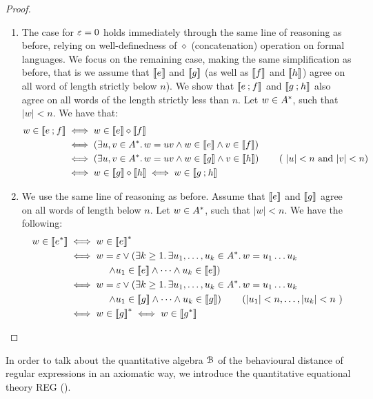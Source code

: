 \begin{proof}
\begin{enumerate}
    \item The case for $\varepsilon = 0$ holds immediately through the same line of reasoning as before, relying on well-definedness of $\diamond$ (concatenation) operation on formal languages. We focus on the remaining case, making the same simplification as before, that is we assume that $\left\llbracket{e}\right\rrbracket$ and $\left\llbracket{g}\right\rrbracket$ (as well as $\left\llbracket{f}\right\rrbracket$ and $\left\llbracket{h}\right\rrbracket$) agree on all word of length strictly below $n$). We show that $\left\llbracket{e \mathbin{;}f}\right\rrbracket$ and $\left\llbracket{g \mathbin{;}h}\right\rrbracket$ also agree on all words of the length strictly less than $n$. Let $w \in {A}^{\ast}$, such that $|w|<n$. We have that: 
    \begin{align*}
        w \in \left\llbracket{e \mathbin{;}f}\right\rrbracket &\iff w \in \left\llbracket{e}\right\rrbracket \diamond \left\llbracket{f}\right\rrbracket\\ &\iff
        \left(\exists u,v \in {A}^\ast \ldotp w=uv \wedge w \in \left\llbracket{e}\right\rrbracket \wedge v \in \left\llbracket{f}\right\rrbracket\right)\\
        &\iff  \left(\exists u,v \in {A}^\ast \ldotp w=uv \wedge w \in \left\llbracket{g}\right\rrbracket \wedge v \in \left\llbracket{h}\right\rrbracket\right) \tag{ $|u|< n$ and $|v| < n$} \\
        &\iff w \in \left\llbracket{g}\right\rrbracket \diamond \left\llbracket{h}\right\rrbracket \iff w \in \left\llbracket{g \mathbin{;}h}\right\rrbracket
    \end{align*}
    \item We use the same line of reasoning as before. Assume that $\left\llbracket{e}\right\rrbracket$ and $\left\llbracket{g}\right\rrbracket$ agree on all words of length below $n$. Let $w \in {A}^\ast$, such that $|w| < n$. We have the following:
    \begin{align*}
        w \in \left\llbracket{e^\ast}\right\rrbracket &\iff w \in \left\llbracket{e}\right\rrbracket^\ast\\ 
        &\iff w = \varepsilon \vee \left(\exists k \geq 1 \ldotp \exists u_1, \dots, u_k \in {A}^\ast \ldotp w = u_1\dots u_k \right.\\&\left. \qquad\qquad\wedge u_1 \in \left\llbracket{e}\right\rrbracket \wedge \dots \wedge u_k \in \left\llbracket{e}\right\rrbracket\right) \\
        &\iff w = \varepsilon \vee \left(\exists k \geq 1 \ldotp \exists u_1, \dots, u_k \in {A}^\ast\ldotp w = u_1\dots u_k \right.\\&\left. \qquad\qquad\wedge u_1 \in \left\llbracket{g}\right\rrbracket \wedge \dots \wedge u_k \in \left\llbracket{g}\right\rrbracket\right) \tag{$|u_1| < n, \dots, |u_k| < n$ }\\
        &\iff w \in \left\llbracket{g}\right\rrbracket^\ast \iff w \in \left\llbracket{g^*}\right\rrbracket
    \end{align*}
\end{enumerate}
\end{proof}
In order to talk about the quantitative algebra $\mathcal{B}$ of the behavioural distance of regular expressions in an axiomatic way, we introduce the quantitative equational theory \textsf{REG} ().

